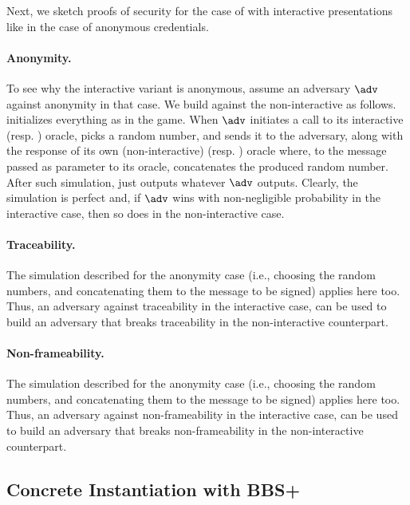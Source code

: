 Next, we sketch proofs of security for the case of \GSAC with interactive
presentations like in the case of anonymous credentials.

\paragraph{Anonymity.} To see why the interactive variant is anonymous, assume
an adversary $\adv$ against anonymity in that case. We build \advB against the
non-interactive \ExpGSACAnonb as follows. \advB initializes everything as in the
\ExpGSACAnonb game. When $\adv$ initiates a call to its interactive \SIGN (resp.
\CHALb) oracle, \advB picks a random number, and sends it to the adversary,
along with the response of its own (non-interactive) \SIGN (resp. \CHALb)
oracle where, to the message passed as parameter to its oracle, concatenates the
produced random number. After such simulation, \advB just outputs whatever
$\adv$ outputs. Clearly, the simulation is perfect and, if $\adv$ wins with
non-negligible probability in the interactive case, then so does \advB in the
non-interactive case.

\paragraph{Traceability.} The simulation described for the anonymity case (i.e.,
\advB choosing the random numbers, and concatenating them to the message to be
signed) applies here too. Thus, an adversary against traceability in the
interactive case, can be used to build an adversary that breaks traceability in
the non-interactive counterpart.

\paragraph{Non-frameability.} The simulation described for the anonymity case
(i.e., \advB choosing the random numbers, and concatenating them to the message
to be signed) applies here too. Thus, an adversary against non-frameability in
the interactive case, can be used to build an adversary that breaks
non-frameability in the non-interactive counterpart. 

\subsection{Concrete Instantiation with BBS+}
\label{sapp:gsac-instantiation}

